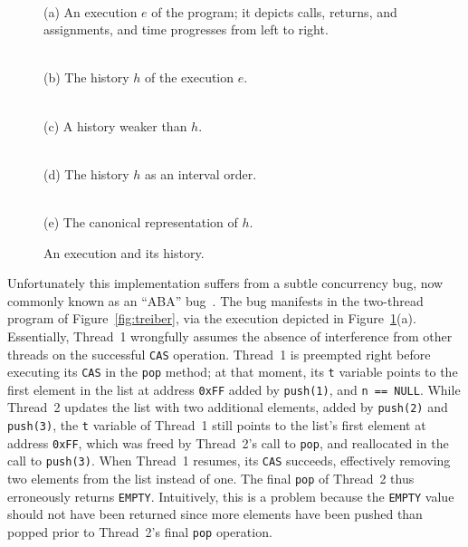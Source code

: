 \begin{figure}[t]
  \footnotesize
  \centering
   \\
  \smallskip
  \parbox{0.8\linewidth}{(a) An execution $e$ of the program; it depicts calls,
  returns, and assignments, and time progresses from left to right.}

  \bigskip
  \begin{minipage}{43mm}
     \\
    (b) The history $h$ of the execution $e$.
  \end{minipage}
  \begin{minipage}{40mm}
     \\
    (c) A history weaker than $h$.
  \end{minipage}

  \bigskip
   \\
  (d) The history $h$ as an interval order.

  \bigskip
   \\
  (e) The canonical representation of $h$.

  \caption{An execution and its history.}
  \label{fig:stacks}
\end{figure}

Unfortunately this implementation suffers from a subtle concurrency bug, now
commonly known as an ``ABA'' bug~\cite{tr/ibm/Michael04}. The bug manifests in
the two-thread program of Figure~\ref{fig:treiber}, via the execution depicted
in Figure~\ref{fig:stacks}(a). Essentially, Thread~1 wrongfully assumes the
absence of interference from other threads on the successful {\tt CAS}
operation. Thread~1 is preempted right before executing its {\tt CAS} in the
{\tt pop} method; at that moment, its {\tt t} variable points to the first
element in the list at address {\tt 0xFF} added by {\tt push(1)}, and {\tt n ==
NULL}. While Thread~2 updates the list with two additional elements, added by
{\tt push(2)} and {\tt push(3)}, the {\tt t} variable of Thread~1 still points
to the list's first element at address {\tt 0xFF}, which was freed by
Thread~2's call to {\tt pop}, and reallocated in the call to {\tt push(3)}.
When Thread~1 resumes, its {\tt CAS} succeeds, effectively removing two
elements from the list instead of one. The final {\tt pop} of Thread~2 thus
erroneously returns {\tt EMPTY}. Intuitively, this is a problem because the
{\tt EMPTY} value should not have been returned since more elements have been
pushed than popped prior to Thread~2's final {\tt pop} operation.


